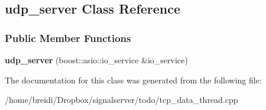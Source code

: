 \hypertarget{classudp__server}{
\subsection{udp\_\-server Class Reference}
\label{classudp__server}
}
\subsubsection*{Public Member Functions}
\begin{DoxyCompactItemize}
\item 
\hypertarget{classudp__server_a3a945f3fd3db7aedf1e2cb8632f7b5a5}{
{\bfseries udp\_\-server} (boost::asio::io\_\-service \&io\_\-service)}
\label{classudp__server_a3a945f3fd3db7aedf1e2cb8632f7b5a5}

\end{DoxyCompactItemize}


The documentation for this class was generated from the following file:\begin{DoxyCompactItemize}
\item 
/home/breidi/Dropbox/signalserver/todo/tcp\_\-data\_\-thread.cpp\end{DoxyCompactItemize}
